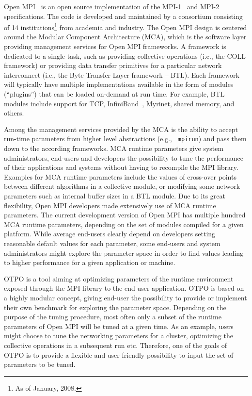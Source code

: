 Open MPI~\cite{gabriel:ompi} is an open source implementation of the
MPI-1~\cite{mpi1} and MPI-2~\cite{mpi2} specifications. The code is
developed and maintained by a consortium consisting of 14
institutions\footnote{As of January, 2008.} from academia and
industry. The Open MPI design is centered around the Modular Component
Architecture (MCA), which is the software layer providing management
services for Open MPI frameworks. A framework is dedicated to a single
task, such as providing collective operations (i.e., the COLL
framework) or providing data transfer primitives for a particular
network interconnect (i.e., the Byte Transfer Layer framework --
BTL). Each framework will typically have multiple implementations
available in the form of modules (``plugins'') that can be loaded
on-demand at run time.  For example, BTL modules include support for
TCP, InfiniBand~\cite{ib}, Myrinet, shared memory, and others.

Among the management services provided by the MCA is the ability to
accept run-time parameters from higher level abstractions (e.g., {\tt
  mpirun}) and pass them down to the according frameworks. MCA runtime
parameters give system administrators, end-users and developers the
possibility to tune the performance of their applications and systems
without having to recompile the MPI library. Examples for MCA runtime
parameters include the values of cross-over points between different
algorithms in a collective module, or modifying some network
parameters such as internal buffer sizes in a BTL module. Due to its
great flexibility, Open MPI developers made extensively use of MCA
runtime parameters.  The current development version of Open MPI has
multiple hundred MCA runtime parameters, depending on the set of
modules compiled for a given platform. While average end-users clearly
depend on developers setting reasonable default values for each
parameter, some end-users and system administrators might explore the
parameter space in order to find values leading to higher performance
for a given application or machine.

OTPO is a tool aiming at optimizing parameters of the runtime environment exposed through the MPI library to the end-user application. OTPO is based on a highly modular concept, giving end-user the possibility to provide or implement their own benchmark for exploring the parameter space. Depending on the purpose of the tuning procedure, most often only a subset of the runtime parameters of Open MPI will be tuned at a given time. As an example, users might choose to tune the networking parameters for a cluster, optimizing the collective operations in a subsequent run etc. Therefore, one of the goals of OTPO is to provide a flexible and user friendly possibility to input the set of parameters to be tuned. 

